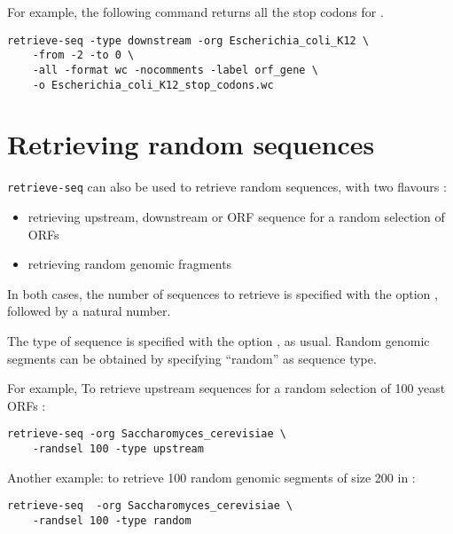 For example, the following command returns all the stop codons for
.

\begin{verbatim}
retrieve-seq -type downstream -org Escherichia_coli_K12 \
    -from -2 -to 0 \
    -all -format wc -nocomments -label orf_gene \
    -o Escherichia_coli_K12_stop_codons.wc
\end{verbatim}

\section{Retrieving random sequences}

\texttt{retrieve-seq} can also be used to retrieve random sequences,
with two flavours :

\begin{itemize}
\item retrieving upstream, downstream or ORF sequence for a random
selection of ORFs
\item retrieving random genomic fragments
\end{itemize}

In both cases, the number of sequences to retrieve is specified with
the option , followed by a natural number.

The type of sequence is specified with the option \option{-type}, as
usual. Random genomic segments can be obtained by specifying
``random'' as sequence type.

For example, To retrieve upstream sequences for a random selection of
100 yeast ORFs :
\begin{verbatim}
retrieve-seq -org Saccharomyces_cerevisiae \
    -randsel 100 -type upstream
\end{verbatim}

Another example: to retrieve 100 random genomic segments of size 200
in  :
\begin{verbatim}
retrieve-seq  -org Saccharomyces_cerevisiae \
    -randsel 100 -type random
\end{verbatim}

